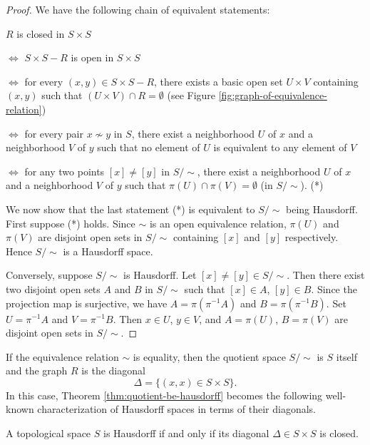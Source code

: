 \begin{proof}
	We have the following chain of equivalent statements:

	$R$ is closed in $S\times S$

	$\Longleftrightarrow$ $S\times S- R$ is open in $S\times S$

	$\Longleftrightarrow$ for every $(x,y)\in S\times S-R$, there exists a
	basic open set $U\times V$ containing $(x,y)$ such that $(U\times V)\cap
		R = \emptyset$ (see Figure \ref{fig:graph-of-equivalence-relation})

	$\Longleftrightarrow$ for every pair $x\not\sim y$ in $S$, there exist a
	neighborhood $U$ of $x$ and a neighborhood $V$ of $y$ such that no
	element of $U$ is equivalent to any element of $V$

	$\Longleftrightarrow$ for any two points $[x]\neq [y]$ in $S/\sim$,
	there exist a neighborhood $U$ of $x$ and a neighborhood $V$ of $y$ such
	that $\pi(U)\cap \pi(V)=\emptyset$ (in $S/\sim$). \qquad\qquad (*)

	We now show that the last statement (*) is equivalent to $S/\sim$ being
	Hausdorff. First suppose (*) holds. Since $\sim$ is an open equivalence
	relation, $\pi(U)$ and $\pi(V)$ are disjoint open sets in $S/\sim$
	containing $[x]$ and $[y]$ respectively. Hence $S/\sim$ is a Hausdorff
	space.

	Conversely, suppose $S/\sim$ is Hausdorff. Let $[x]\neq [y] \in
		S/\sim$. Then there exist two disjoint open sets $A$ and $B$ in
	$S/\sim$ such that $[x]\in A$, $[y]\in B$. Since the projection map is
	surjective, we have $A=\pi(\pi^{-1} A)$ and $B=\pi(\pi^{-1}B)$. Set
	$U=\pi^{-1}A$ and $V = \pi^{-1}B$. Then $x\in U$, $y\in V$, and
	$A=\pi(U)$, $B=\pi(V)$ are disjoint open sets in $S/\sim$.
\end{proof}

If the equivalence relation $\sim$ is equality, then the quotient space
$S/\sim$ is $S$ itself and the graph $R$ is the diagonal
\begin{displaymath}
	\Delta = \{(x,x)\in S\times S\}.
\end{displaymath}
In this case, Theorem \ref{thm:quotient-be-hausdorff} becomes the following
well-known characterization of Hausdorff spaces in terms of their diagonals.

\begin{corollary}\label{cor:quotient-space-diagonal}
	A topological space $S$ is Hausdorff if and only if its diagonal
	$\Delta\in S\times S$ is closed.
\end{corollary}

